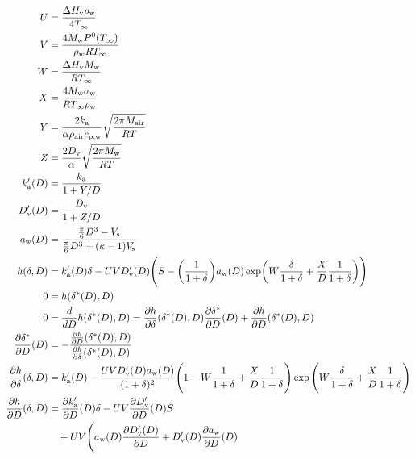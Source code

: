 \documentclass{article}
\begin{document}
\begin{align}
  U &= \frac{\Delta H_{\rm v} \rho_{\rm w}}{4 T_{\infty}} \\
  V &= \frac{4 M_{\rm w} P^{\rm 0}(T_{\infty})}{\rho_w R T_{\infty}} \\
  W &= \frac{\Delta H_{\rm v} M_{\rm w}}{R T_{\infty}} \\
  X &= \frac{4 M_{\rm w}\sigma_{\rm w}}{R T_{\infty} \rho_{\rm w}} \\
  Y &= \frac{2 k_{\rm a}}{\alpha \rho_{\rm air} c_{\rm p,w}} \sqrt{\frac{2 \pi M_{\rm air}}{R T}} \\
  Z &= \frac{2 D_{\rm v}}{\alpha} \sqrt{\frac{2 \pi M_{\rm w}}{R T}} \\
  k_{\rm a}'(D) &= \frac{k_{\rm a}}{1 + Y / D} \\
  D_{\rm v}'(D) &= \frac{D_{\rm v}}{1 + Z / D} \\
  a_{\rm w}(D) &= \frac{\frac{\pi}{6}D^3 - V_{\rm s}}{\frac{\pi}{6}D^3 + (\kappa - 1) V_{\rm s}} \\
  h(\delta, D) &= k_{\rm a}'(D) \delta
  - U V D_{\rm v}'(D) \Biggl(S - \biggl(\frac{1}{1+\delta}\biggr)
  a_{\rm w}(D)
  \exp\biggl(W \frac{\delta}{1+\delta} + \frac{X}{D} \frac{1}{1+\delta}\biggr) \Biggr) \\
  0 &= h(\delta^*(D), D) \\
  0 &= \frac{d}{d D} h(\delta^*(D), D)
  = \frac{\partial h}{\partial \delta}(\delta^*(D), D)
  \frac{\partial \delta^*}{\partial D}(D)
  + \frac{\partial h}{\partial D}(\delta^*(D), D) \\
  \frac{\partial \delta^*}{\partial D}(D)
  &= - \frac{\frac{\partial h}{\partial D}(\delta^*(D), D)}{\frac{\partial h}{\partial \delta}(\delta^*(D), D)} \\
  \frac{\partial h}{\partial \delta}(\delta, D) &= k_{\rm a}'(D) -
  \frac{U V D_{\rm v}'(D) a_{\rm w}(D)}{(1 + \delta)^2} \Biggl( 1 - W \frac{1}{1+\delta}
  + \frac{X}{D} \frac{1}{1+\delta} \Biggr) \exp{\Biggl(W \frac{\delta}{1+\delta} +
      \frac{X}{D} \frac{1}{1+\delta}\Biggr)} \\
  \frac{\partial h}{\partial D}(\delta, D) &=
  \frac{\partial k_{\rm a}'}{\partial D}(D) \delta
  - U V \frac{\partial D_{\rm v}'}{\partial D}(D) S \nonumber \\
  &\quad + U V \Biggl( a_{\rm w}(D) \frac{\partial D_{\rm v}'(D)}{\partial D}+ D_{\rm v}'(D) \frac{\partial a_{\rm w}}{\partial D}(D)

\end{align}
\end{document}
